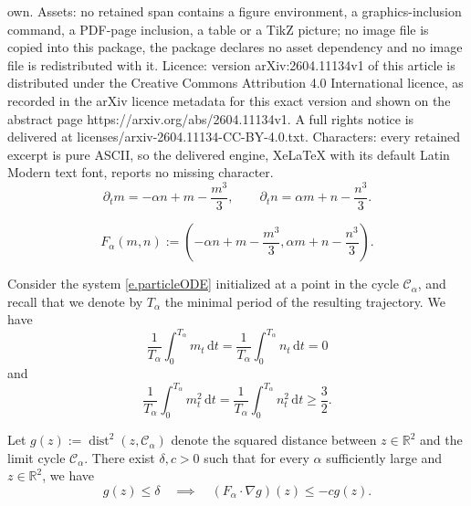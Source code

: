 \documentclass[10pt,a4paper]{amsart}
\DeclareMathOperator{\dist}{dist}
\newcommand{\Ll}{\left}
\newcommand{\Rr}{\right}
\newcommand{\R}{\mathbb{R}}
\newcommand{\al}{\alpha}
\newcommand{\de}{\delta}
\newcommand{\dr}{\partial}
\newcommand{\msc}{\mathscr}
\renewcommand{\d}{\mathrm{d}}
\renewcommand{\ge}{\geqslant}
\renewcommand{\le}{\leqslant}
\begin{document}
own. Assets: no retained span contains a figure environment, a graphics-inclusion command, a PDF-page inclusion, a table or a TikZ picture; no image file is copied into this package, the package declares no asset dependency and no image file is redistributed with it. Licence: version arXiv:2604.11134v1 of this article is distributed under the Creative Commons Attribution 4.0 International licence, as recorded in the arXiv licence metadata for this exact version and shown on the abstract page https://arxiv.org/abs/2604.11134v1. A full rights notice is delivered at licenses/arxiv-2604.11134-CC-BY-4.0.txt. Characters: every retained excerpt is pure ASCII, so the delivered engine, XeLaTeX with its default Latin Modern text font, reports no missing character.
\begin{equation}
\label{e.particleODE}
\dr_t m = -\al n + m - \frac{m^3}{3}, \qquad \dr_t n = \al m + n - \frac{n^3}{3}.
\end{equation}

\begin{equation}  
\label{e.def.F}
F_\al (m,n) := \Ll(-\al n+m-\frac{m^3}{3}, \al m + n - \frac{n^3}{3}\Rr).
\end{equation}

\begin{proposition}
\label{p.square} Consider the system \eqref{e.particleODE} initialized at a point in the cycle $\msc C_\al$, and recall that we denote by $T_\al$ the minimal period of the resulting trajectory. We have
\begin{equation}
\label{e.mean}
\frac 1 {T_\al} \int_0^{T_\al} m_t \, \d t = \frac 1 {T_\al} \int_0^{T_\al} n_t \, \d t = 0
\end{equation}
and
\begin{equation}  
\label{e.square}
\frac 1 {T_\al} \int_0^{T_\al} m_t^2 \, \d t = \frac 1 {T_\al} \int_0^{T_\al} n_t^2 \, \d t \ge \frac 3 2.
\end{equation}
\end{proposition}

\begin{proposition}
\label{p.lyapunov}
Let $g(z) := \dist^2(z,\msc C_\al)$ denote the squared distance between $z \in \R^2$ and the limit cycle $\msc C_\al$. There exist $\delta, c > 0$ such that for every $\al$ sufficiently large and $z \in \R^2$, we have
\begin{equation*}  %
g(z) \le \de  \quad \implies \quad (F_\al \cdot \nabla g)(z) \le -c  g(z).
\end{equation*}
\end{proposition}
\end{document}
